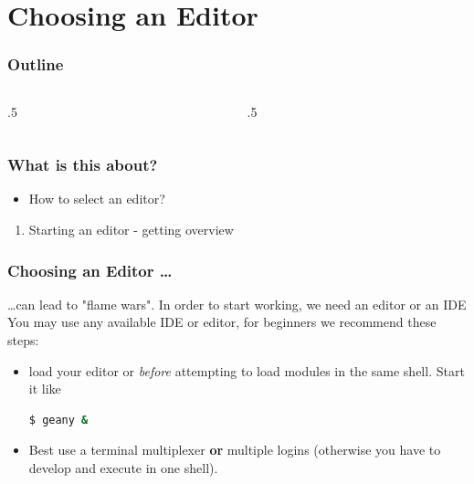 \section{Choosing an Editor}

\ifdefined\ishandout
{
	\frame{
		\tableofcontents[currentsection]
	}
}
\else
\begin{frame}
	\frametitle{Outline}
	\begin{columns}[t]
		\begin{column}{.5\textwidth}
			\tableofcontents[sections={1-9},currentsection]
		\end{column}
		\begin{column}{.5\textwidth}
			\tableofcontents[sections={10-18},currentsection]
		\end{column}
	\end{columns}
\end{frame}
\fi

\begin{frame}
	\frametitle{What is this about?}
	\begin{question}
		\begin{itemize}
			\item How to select an editor?
		\end{itemize}
	\end{question}
	\begin{docs}[Objectives]
		\begin{enumerate}
			\item Starting an editor - getting overview
		\end{enumerate}
	\end{docs}
\end{frame}

\begin{frame}[fragile]
	\frametitle{Choosing an Editor \ldots}
	\ldots can lead to "flame wars". In order to start working, we need an editor or an IDE \pause\newline
	You may use any available IDE or editor, for beginners we recommend these steps:
	\begin{itemize}[<+->]
		\item load your editor  or  \emph{before} attempting to load modules in the same shell. Start it like
		\begin{lstlisting}[language=Bash, style=Shell]
$ geany & 
		\end{lstlisting}
		\item Best use a terminal multiplexer \textbf{or} multiple logins (otherwise you have to develop and execute in one shell).
	\end{itemize}
\end{frame}
